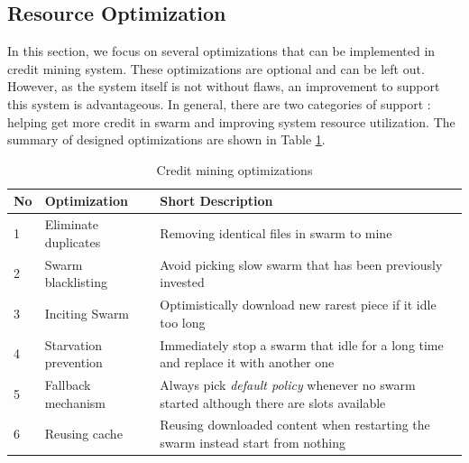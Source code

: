 \subsection{Resource Optimization}
\label{section:optimization}
In this section, we focus on several optimizations that can be implemented in credit mining system. These optimizations are optional and can be left out. However, as the system itself is not without flaws, an improvement to support this system is advantageous. In general, there are two categories of support : helping get more credit in swarm and improving system resource utilization. The summary of designed optimizations are shown in Table \ref{tbl:optimizations}.

\begin{table}[t]
	\centering
	\caption{Credit mining optimizations}
	\label{tbl:optimizations}
	\begin{adjustwidth}{-1.5cm}{}
		\begin{tabular}{|p{0.7cm}|p{4cm}|p{10cm}|}
		\hline
		\rowcolor[HTML]{EFEFEF} 
		\hline
		\textbf{No} & \textbf{Optimization}& \textbf{Short Description} \\ \hline
		1  & Eliminate duplicates  & Removing identical files in swarm to mine \\ \hline
		2  & Swarm blacklisting    & Avoid picking slow swarm that has been previously invested\\ \hline
		3  & Inciting Swarm & Optimistically download new rarest piece if it idle too long\\ \hline
		4  & Starvation prevention & Immediately stop a swarm that idle for a long time and replace it with another one\\ \hline
		5  & Fallback mechanism    & Always pick \textit{default policy} whenever no swarm started although there are slots available \\ \hline
		6  & Reusing cache         & Reusing downloaded content when restarting the swarm instead start from nothing \\ \hline
		\end{tabular}
	\end{adjustwidth}
\end{table}

